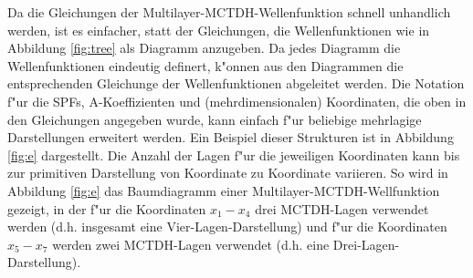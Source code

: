 Da die Gleichungen der Multilayer-MCTDH-Wellenfunktion schnell unhandlich werden, ist es einfacher, statt der Gleichungen, die Wellenfunktionen 
wie in Abbildung \ref{fig:tree}
als Diagramm anzugeben. Da jedes Diagramm die Wellenfunktionen eindeutig definert, k"onnen aus den Diagrammen die entsprechenden
Gleichunge der Wellenfunktionen abgeleitet werden.
Die Notation f"ur die SPFs, A-Koeffizienten und (mehrdimensionalen) Koordinaten, die oben in den Gleichungen angegeben wurde,
kann einfach f"ur beliebige mehrlagige Darstellungen erweitert werden. 
Ein Beispiel dieser Strukturen ist in Abbildung \ref{fig:e} dargestellt. 
Die Anzahl der Lagen f"ur die jeweiligen Koordinaten kann bis zur primitiven Darstellung von 
Koordinate zu Koordinate variieren.
So wird in Abbildung \ref{fig:e} das Baumdiagramm einer Multilayer-MCTDH-Wellfunktion gezeigt, 
in der f"ur die Koordinaten $ x_1-x_4 $ drei MCTDH-Lagen verwendet werden 
(d.h. insgesamt eine Vier-Lagen-Darstellung)
und f"ur die Koordinaten $ x_5 - x_7 $  werden zwei MCTDH-Lagen verwendet (d.h. eine Drei-Lagen-Darstellung).

